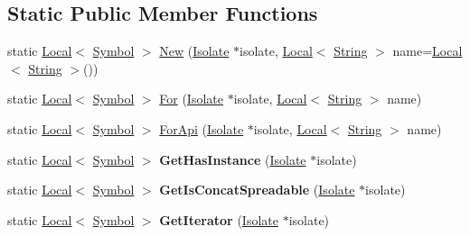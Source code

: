 \subsection*{Static Public Member Functions}
\begin{DoxyCompactItemize}
\item 
static \mbox{\hyperlink{classv8_1_1Local}{Local}}$<$ \mbox{\hyperlink{classv8_1_1Symbol}{Symbol}} $>$ \mbox{\hyperlink{classv8_1_1Symbol_add1f6084974464105b56595d34c14ab9}{New}} (\mbox{\hyperlink{classv8_1_1Isolate}{Isolate}} $\ast$isolate, \mbox{\hyperlink{classv8_1_1Local}{Local}}$<$ \mbox{\hyperlink{classv8_1_1String}{String}} $>$ name=\mbox{\hyperlink{classv8_1_1Local}{Local}}$<$ \mbox{\hyperlink{classv8_1_1String}{String}} $>$())
\item 
static \mbox{\hyperlink{classv8_1_1Local}{Local}}$<$ \mbox{\hyperlink{classv8_1_1Symbol}{Symbol}} $>$ \mbox{\hyperlink{classv8_1_1Symbol_a8a4a6bdc7d3e31c71cf48fa5cb811fc8}{For}} (\mbox{\hyperlink{classv8_1_1Isolate}{Isolate}} $\ast$isolate, \mbox{\hyperlink{classv8_1_1Local}{Local}}$<$ \mbox{\hyperlink{classv8_1_1String}{String}} $>$ name)
\item 
static \mbox{\hyperlink{classv8_1_1Local}{Local}}$<$ \mbox{\hyperlink{classv8_1_1Symbol}{Symbol}} $>$ \mbox{\hyperlink{classv8_1_1Symbol_ac3937f0b0b831c4be495a399f26d7301}{For\+Api}} (\mbox{\hyperlink{classv8_1_1Isolate}{Isolate}} $\ast$isolate, \mbox{\hyperlink{classv8_1_1Local}{Local}}$<$ \mbox{\hyperlink{classv8_1_1String}{String}} $>$ name)
\item 
\mbox{\label{classv8_1_1Symbol_ad23ee69f0680db333469272554b07a6e}} 
static \mbox{\hyperlink{classv8_1_1Local}{Local}}$<$ \mbox{\hyperlink{classv8_1_1Symbol}{Symbol}} $>$ {\bfseries Get\+Has\+Instance} (\mbox{\hyperlink{classv8_1_1Isolate}{Isolate}} $\ast$isolate)
\item 
\mbox{\label{classv8_1_1Symbol_acf0d506838dbf518537c17a72571c0bf}} 
static \mbox{\hyperlink{classv8_1_1Local}{Local}}$<$ \mbox{\hyperlink{classv8_1_1Symbol}{Symbol}} $>$ {\bfseries Get\+Is\+Concat\+Spreadable} (\mbox{\hyperlink{classv8_1_1Isolate}{Isolate}} $\ast$isolate)
\item 
\mbox{\label{classv8_1_1Symbol_a35aa1aca7135c5bf9052d8d067d126b1}} 
static \mbox{\hyperlink{classv8_1_1Local}{Local}}$<$ \mbox{\hyperlink{classv8_1_1Symbol}{Symbol}} $>$ {\bfseries Get\+Iterator} (\mbox{\hyperlink{classv8_1_1Isolate}{Isolate}} $\ast$isolate)

\end{DoxyCompactItemize}
